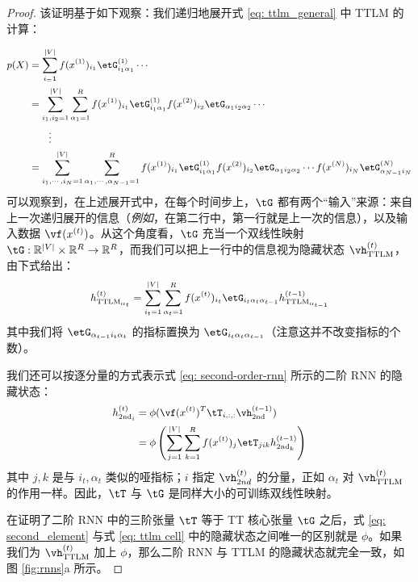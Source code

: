 \begin{proof} 该证明基于如下观察：我们递归地展开式 \ref{eq: ttlm_general} 中 TTLM 的计算：

\begin{equation} \small
\begin{aligned}
\label{eq: TTLM_unfold}
p(X) &= \sum_{{i_ = 1}}^{|V|} f(x^{(1)})_{i_1}\etG^{(1)}_{i_1\alpha_{1}}  \cdots \\
&= \sum_{{i_1,i_2 = 1}}^{|V|} \sum_{\alpha_1 = 1}^R   f(x^{(1)})_{i_1}\etG^{(1)}_{i_1\alpha_{1}} f(x^{(2)})_{i_2} \etG_{\alpha_{1}i_2\alpha_{2}} \cdots  \\
&  \quad\quad\vdots \\
&= \sum_{i_1, \cdots, i_N = 1}^{|V|}
    \sum_{\alpha_1, \cdots ,\alpha_{N-1} =1}^{R}  f(x^{(1)})_{i_1}\etG^{(1)}_{i_1\alpha_1}
    f(x^{(2)})_{i_2}\etG_{\alpha_1i_2\alpha_2} \cdots f(x^{(N)})_{i_N}\etG^{(N)}_{\alpha_{N-1}i_N}   \\
\end{aligned}
\end{equation}
%
可以观察到，在上述展开式中，在每个时间步上，$\tG$ 都有两个``输入''来源：来自上一次递归展开的信息（\textit{例如}，在第二行中，第一行就是上一次的信息），以及输入数据 $\vf(x^{(t)})$。从这个角度看，$\tG$ 充当一个双线性映射 $\tG: \mathbb{R}^{|V|} \times \mathbb{R}^R \rightarrow \mathbb{R}^R $，而我们可以把上一行中的信息视为隐藏状态 $\vh^{(t)}_\text{TTLM}$，由下式给出：
%
\begin{equation} \small
\begin{split}
    \label{eq: ttlm cell}
    h^{(t)}_{\textrm{TTLM}_{\alpha_{t}}}
    & = \sum_{{i_t = 1}}^{|V|} \sum_{{\alpha_t = 1}}^{R} f(x^{(t)})_{i_t}\etG_{i_t\alpha_{t}\alpha_{t-1}}  h^{(t-1)}_{\textrm{TTLM}_{\alpha_{t-1}}} \\
\end{split}
\end{equation}
%
其中我们将 $\etG_{\alpha_{t-1}i_t\alpha_{t}}$ 的指标置换为 $\etG_{i_t\alpha_{t}\alpha_{t-1}}$（注意这并不改变指标的个数）。

我们还可以按逐分量的方式表示式 \ref{eq: second-order-rnn} 所示的二阶 RNN 的隐藏状态：
%
\begin{equation} \small
\begin{split}
    \label{eq: second_element}
    h^{(t)}_{\textrm{2nd}_i}
    &= \phi(\vf(x^{(t)})^T \tT_{i, :, :}\vh^{(t-1)}_\textrm{2nd}) \\
    &= \phi\left(\sum^{|V|}_{j=1}\sum^{R}_{k=1} f(x^{(t)})_j\etT_{jik} h^{(t-1)}_{\textrm{2nd}_{k}}\right) \\
\end{split}
\end{equation}
%
其中 $j,k$ 是与 $i_t, \alpha_{t}$ 类似的哑指标；$i$ 指定 $\vh^{(t)}_{2nd}$ 的分量，正如 $\alpha_t$ 对 $\vh^{(t)}_\text{TTLM}$ 的作用一样。因此，$\tT$ 与 $\tG$ 是同样大小的可训练双线性映射。

在证明了二阶 RNN 中的三阶张量 $\tT$ 等于 TT 核心张量 $\tG$ 之后，式 \ref{eq: second_element} 与式 \ref{eq: ttlm cell} 中的隐藏状态之间唯一的区别就是 $\phi$。如果我们为 $\vh^{(t)}_\text{TTLM}$ 加上 $\phi$，那么二阶 RNN 与 TTLM 的隐藏状态就完全一致，如图 \ref{fig:rnns}a 所示。


\end{proof}

